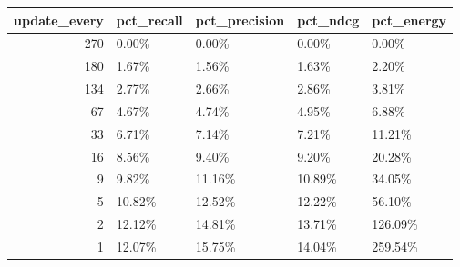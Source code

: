 \begin{tabular}{rllll}
\toprule
update_every & pct_recall & pct_precision & pct_ndcg & pct_energy \\
\midrule
270 & 0.00\% & 0.00\% & 0.00\% & 0.00\% \\
180 & 1.67\% & 1.56\% & 1.63\% & 2.20\% \\
134 & 2.77\% & 2.66\% & 2.86\% & 3.81\% \\
67 & 4.67\% & 4.74\% & 4.95\% & 6.88\% \\
33 & 6.71\% & 7.14\% & 7.21\% & 11.21\% \\
16 & 8.56\% & 9.40\% & 9.20\% & 20.28\% \\
9 & 9.82\% & 11.16\% & 10.89\% & 34.05\% \\
5 & 10.82\% & 12.52\% & 12.22\% & 56.10\% \\
2 & 12.12\% & 14.81\% & 13.71\% & 126.09\% \\
1 & 12.07\% & 15.75\% & 14.04\% & 259.54\% \\
\bottomrule
\end{tabular}

